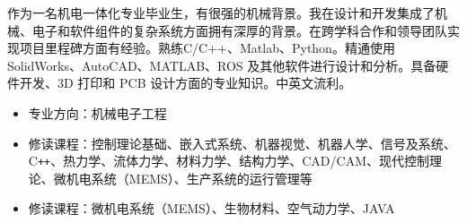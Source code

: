 作为一名机电一体化专业毕业生，有很强的机械背景。我在设计和开发集成了机械、电子和软件组件的复杂系统方面拥有深厚的背景。在跨学科合作和领导团队实现项目里程碑方面有经验。熟练C/C++、Matlab、Python。精通使用 SolidWorks、AutoCAD、MATLAB、ROS 及其他软件进行设计和分析。具备硬件开发、3D 打印和 PCB 设计方面的专业知识。中英文流利。
\begin{itemize}
  \item 专业方向：机械电子工程
\end{itemize}

\begin{itemize}
  \item 修读课程：控制理论基础、嵌入式系统、机器视觉、机器人学、信号及系统、C\texttt{++}、热力学、流体力学、材料力学、结构力学、CAD/CAM、现代控制理论、微机电系统（MEMS）、生产系统的运行管理等
\end{itemize}

\begin{itemize}
  \item 修读课程：微机电系统（MEMS）、生物材料、空气动力学、JAVA 
\end{itemize}






